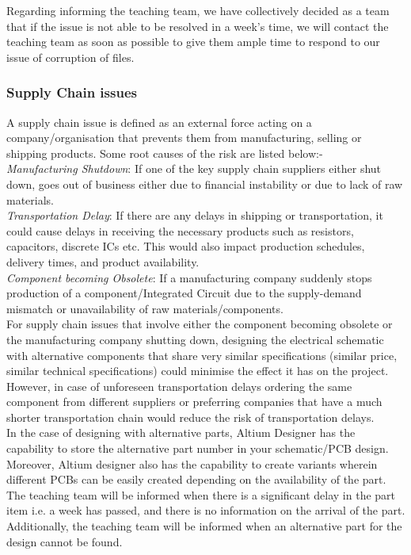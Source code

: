 Regarding informing the teaching team, we have collectively decided as a team that if the issue is not able to be resolved in a week's time, we will contact the teaching team as soon as possible to give them ample time to respond to our issue of corruption of files.


\subsubsection{Supply Chain issues}

A supply chain issue is defined as an external force acting on a company/organisation that prevents them from manufacturing, selling or shipping products. Some root causes of the risk are listed below:-
\\

\emph{Manufacturing Shutdown}: If one of the key supply chain suppliers either shut down, goes out of business either due to financial instability or due to lack of raw materials.
\\

\emph{Transportation Delay}: If there are any delays in shipping or transportation, it could cause delays in receiving the necessary products such as resistors, capacitors, discrete ICs etc. This would also impact production schedules, delivery times, and product availability.
\\

\emph{Component becoming Obsolete}: If a manufacturing company suddenly stops production of a component/Integrated Circuit due to the supply-demand mismatch or unavailability of raw materials/components.
\\

For supply chain issues that involve either the component becoming obsolete or the manufacturing company shutting down, designing the electrical schematic with alternative components that share very similar specifications (similar price, similar technical specifications) could minimise the effect it has on the project. However, in case of unforeseen transportation delays ordering the same component from different suppliers or preferring companies that have a much shorter transportation chain would reduce the risk of transportation delays.
\\

In the case of designing with alternative parts, Altium Designer has the capability to store the alternative part number in your schematic/PCB design. Moreover, Altium designer also has the capability to create variants wherein different PCBs can be easily created depending on the availability of the part. The teaching team will be informed when there is a significant delay in the part item i.e. a week has passed, and there is no information on the arrival of the part. Additionally, the teaching team will be informed when an alternative part for the design cannot be found.